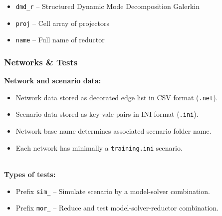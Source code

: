 \documentclass[%
aspectratio=43 %
,table %
]{beamer}
\begin{document}
\begin{frame}
\begin{itemize}
 \item \texttt{dmd\_r} -- Structured Dynamic Mode Decomposition Galerkin

\end{itemize}

\begin{center}


\end{center}

\begin{itemize}\itemsep.3ex

 \item \texttt{proj} -- Cell array of projectors

 \item \texttt{name} -- Full name of reductor

\end{itemize}

\end{frame}


\begin{frame}\frametitle{Networks \& Tests}

\textbf{Network and scenario data:}
\begin{itemize}

 \item Network data stored as decorated edge list in CSV format (\texttt{.net}). 

 \item Scenario data stored as key-vale pairs in INI format (\texttt{.ini}).

 \item Network base name determines associated scenario folder name.

 \item Each network has minimally a \texttt{training.ini} scenario.

\end{itemize}

~\\

\textbf{Types of tests:}
\begin{itemize}

 \item Prefix \texttt{sim\_} -- Simulate scenario by a model-solver combination.

 \item Prefix \texttt{mor\_} -- Reduce and test model-solver-reductor combination.

\end{itemize}

\end{frame}
\end{document}
